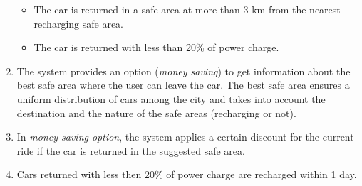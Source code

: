 \begin{enumerate}
					\begin{itemize}
						\item The car is returned in a safe area at more than 3 km from the nearest recharging safe area.
						\item The car is returned with less than 20\% of power charge.
					\end{itemize}
				\item The system provides an option (\textit{money saving}) to get information about the best safe area where the user can leave the car. The best safe area ensures a uniform distribution of cars among the city and takes into account the destination and the nature of the safe areas (recharging or not).
				\item In \textit{money saving option}, the system applies a certain discount for the current ride if the car is returned in the suggested safe area. %
				\item Cars returned with less then 20\% of power charge are recharged within 1 day.
			\end{enumerate}
			
			
			
			
